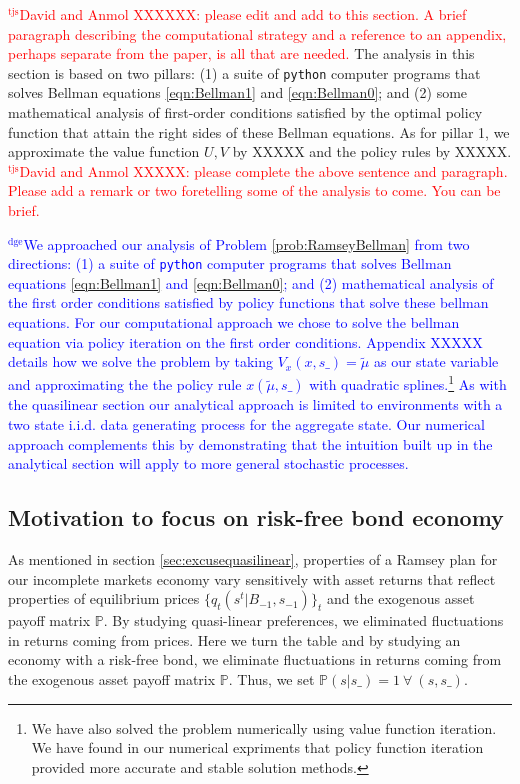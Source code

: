 \documentclass[12pt]{article}
\newcommand{\dge}[1]{\textcolor{blue}{$^{\textrm{dge}}${#1}}}
\newcommand{\tjs}[1]{\textcolor{red}{$^{\textrm{tjs}}${#1}}}
\begin{document}
\tjs{David and Anmol XXXXXX: please edit and add to this section. A brief paragraph describing the computational strategy and a reference to an appendix, perhaps 
separate from the paper, is all that are needed.}
The analysis in this section is based on two pillars: (1) a suite of \texttt{python} computer programs that solves Bellman equations
\eqref{eqn:Bellman1} and \eqref{eqn:Bellman0}; and (2) some mathematical analysis of first-order conditions satisfied by
the  optimal policy function that attain the right sides of these Bellman equations.  
As for pillar 1, we approximate the value function $U, V$ by XXXXX and the policy rules by XXXXX.
\tjs{David and Anmol XXXXX: please complete the above sentence and paragraph. Please add a remark or two foretelling some of the analysis to come. You can be brief.}

\dge{We approached our analysis of Problem \ref{prob:RamseyBellman} from two directions: (1) a suite of \texttt{python} computer programs that solves Bellman equations \eqref{eqn:Bellman1} and \eqref{eqn:Bellman0}; and (2) mathematical analysis of the first order conditions satisfied by policy functions that solve these bellman equations.  For our computational approach we chose to solve the bellman equation via policy iteration on the first order conditions.  Appendix XXXXX details how we solve the problem by taking $V_x(x,s\_) = \tilde{\mu}$ as our state variable and approximating the the policy rule $x(\tilde \mu,s\_)$ with quadratic splines.\footnote{We have also solved the problem numerically using value function iteration.  We have found in our numerical expriments that policy function iteration provided more accurate and stable solution methods.}  As with the quasilinear section our analytical approach is limited to environments with a two state i.i.d. data generating process for the aggregate state.  Our numerical approach complements this by demonstrating that the intuition built up in the analytical section will apply to more general stochastic processes.}

\subsection{Motivation to focus on risk-free bond economy\label{sec:riskfreeonly}}

As mentioned in section \ref{sec:excusequasilinear},  properties of a Ramsey plan for our incomplete markets economy vary sensitively  with   asset returns that reflect
	properties of equilibrium prices $\{q_t(s^t|B_{-1},s_{-1})\}_t$ and the exogenous asset payoff matrix $\mathbb{P}$.  By studying
quasi-linear preferences, we eliminated fluctuations in returns coming from prices.  Here we turn the table and by studying an economy
with a risk-free bond, we eliminate fluctuations in returns coming from the exogenous asset payoff matrix $\mathbb{P}$.
Thus, we set $\mathbb{P}(s|s\_)=1 \ \forall \ (s,s\_)$.
\end{document}
